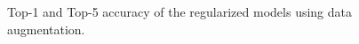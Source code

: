\newpage
\begin{figure}[H]
	\centering
    \qquad
	\caption{Top-1 and Top-5 accuracy of the regularized models using data augmentation.}%
	\label{fig:exp2}%
\end{figure}

